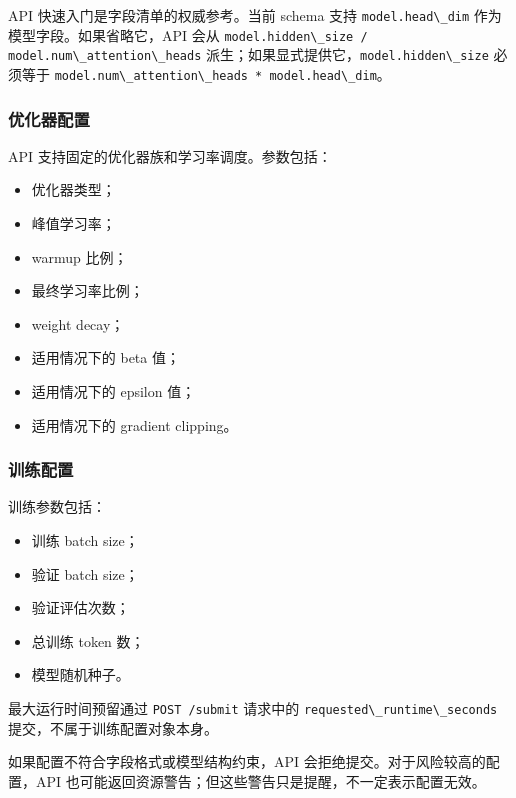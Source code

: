 \documentclass[
  11pt,
]{ctexart}
\newcommand{\passthrough}[1]{#1}
\providecommand{\tightlist}{%
  \setlength{\itemsep}{0pt}\setlength{\parskip}{0pt}}
\begin{document}
API 快速入门是字段清单的权威参考。当前 schema 支持
\passthrough{\lstinline!model.head\_dim!} 作为模型字段。如果省略它，API
会从
\passthrough{\lstinline!model.hidden\_size / model.num\_attention\_heads!}
派生；如果显式提供它，\passthrough{\lstinline!model.hidden\_size!}
必须等于
\passthrough{\lstinline!model.num\_attention\_heads * model.head\_dim!}。

\hypertarget{ux4f18ux5316ux5668ux914dux7f6e}{%
\subsubsection{优化器配置}\label{ux4f18ux5316ux5668ux914dux7f6e}}

API 支持固定的优化器族和学习率调度。参数包括：

\begin{itemize}
\tightlist
\item
  优化器类型；
\item
  峰值学习率；
\item
  warmup 比例；
\item
  最终学习率比例；
\item
  weight decay；
\item
  适用情况下的 beta 值；
\item
  适用情况下的 epsilon 值；
\item
  适用情况下的 gradient clipping。
\end{itemize}

\hypertarget{ux8badux7ec3ux914dux7f6e-1}{%
\subsubsection{训练配置}\label{ux8badux7ec3ux914dux7f6e-1}}

训练参数包括：

\begin{itemize}
\tightlist
\item
  训练 batch size；
\item
  验证 batch size；
\item
  验证评估次数；
\item
  总训练 token 数；
\item
  模型随机种子。
\end{itemize}

最大运行时间预留通过 \passthrough{\lstinline!POST /submit!} 请求中的
\passthrough{\lstinline!requested\_runtime\_seconds!}
提交，不属于训练配置对象本身。

如果配置不符合字段格式或模型结构约束，API
会拒绝提交。对于风险较高的配置，API
也可能返回资源警告；但这些警告只是提醒，不一定表示配置无效。
\end{document}
